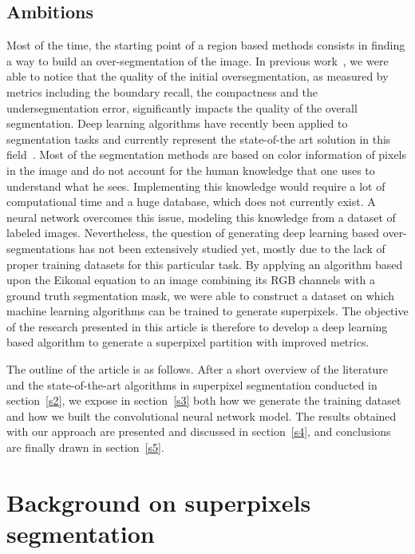 \documentclass{article}
\begin{document}
    \subsection{Ambitions}
        Most of the time, the starting point of a region based methods consists in finding a way to build an over-segmentation of the image. In previous work~\cite{chang2019}, we were able to notice that the quality of the initial oversegmentation, as measured by metrics including the boundary recall, the compactness and the undersegmentation error, significantly impacts the quality of the overall segmentation.
        Deep learning algorithms have recently been applied to segmentation tasks and currently represent the state-of-the art solution in this field~\cite{unet2015,long2015}. Most of the segmentation methods are based on color information of pixels in the image and do not account for the human knowledge that one uses to understand what he sees. Implementing this knowledge would require a lot of computational time and a huge database, which does not currently exist. A neural network overcomes this issue, modeling this knowledge from a dataset of labeled images. Nevertheless, the question of generating deep learning based over-segmentations has not been extensively studied yet, mostly due to the lack of proper training datasets for this particular task. By applying an algorithm based upon the Eikonal equation to an image combining its RGB channels with a ground truth segmentation mask, we were able to construct a dataset on which machine learning algorithms can be trained to generate superpixels.
        The objective of the research presented in this article is therefore to develop a deep learning based algorithm to generate a superpixel partition with improved metrics.
        \par
        The outline of the article is as follows. After a short overview of the literature and the state-of-the-art algorithms in superpixel segmentation conducted in section~\ref{s2}, we expose in section~\ref{s3} both how we generate the training dataset and how we built the convolutional neural network model. The results obtained with our approach are presented and discussed in section~\ref{s4}, and conclusions are finally drawn in section~\ref{s5}.

\newpage
\section{Background on superpixels segmentation\label{s2}}
\end{document}
